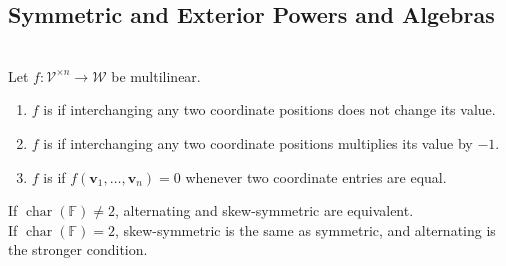 \subsection{Symmetric and Exterior Powers and Algebras}


\begin{definition} \label{def:special-multilinear-maps} \\
Let $f:\mathcal{V}^{\times n}\to\mathcal{W}$ be multilinear.
\begin{enumerate}[label=(\roman*)]
\setlength{\itemsep}{0pt}
\item $f$ is  if interchanging any two coordinate positions does not change its value.
\item $f$ is  if interchanging any two coordinate positions multiplies its value by $-1$.
\item $f$ is  if $f(\mathbf{v}_1,\ldots,\mathbf{v}_n)=0$ whenever two coordinate entries are equal.
\end{enumerate}
If $\operatorname{char}(\mathbb{F})\neq2$, alternating and skew-symmetric are equivalent.\\
If $\operatorname{char}(\mathbb{F})=2$, skew-symmetric is the same as symmetric, and alternating is the stronger condition.
\end{definition}


